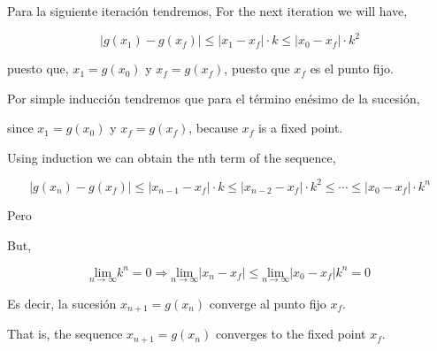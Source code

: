 \begin{paracol}{2}
Para la siguiente iteración tendremos,
\switchcolumn
For the next iteration we will have,
\end{paracol}
\begin{equation*}
\vert g(x_1)-g(x_f) \vert \leq \vert x_1-x_f \vert \cdot k \leq \vert x_0-x_f \vert \cdot k^2 
\end{equation*}

\begin{paracol}{2}
puesto que,  $x_1=g(x_0)$ y $x_f = g(x_f)$, puesto que $x_f$ es el punto fijo. 

Por simple inducción tendremos que para el término enésimo de la sucesión,

\switchcolumn
since $x_1=g(x_0)$ y $x_f = g(x_f)$, because $x_f$ is a fixed point.

Using induction we can obtain the nth term of the sequence,
\end{paracol}
\begin{equation*}
\vert g(x_n)-g(x_f) \vert \leq \vert x_{n-1}-x_f \vert \cdot k \leq \vert x_{n-2}-x_f \vert \cdot k^2 \leq \cdots \leq  \vert x_0-x_f \vert \cdot k^n 
\end{equation*}

\begin{paracol}{2}
Pero

\switchcolumn
But,
\end{paracol}

\begin{equation*}
\underset{n\rightarrow \infty}{\text{lim}}k^n=0 \Rightarrow \underset{n\rightarrow \infty}{\text{lim}} \vert x_n-x_f \vert \leq \underset{n\rightarrow \infty}{\text{lim}}\vert x_0-x_f \vert k^n =0
\end{equation*} 

\begin{paracol}{2}
Es decir, la sucesión  $x_{n+1}=g(x_n)$ converge al punto fijo $x_f$.

\switchcolumn
That is, the sequence $x_{n+1}=g(x_n)$ converges to the fixed point $x_f$.
\end{paracol}


